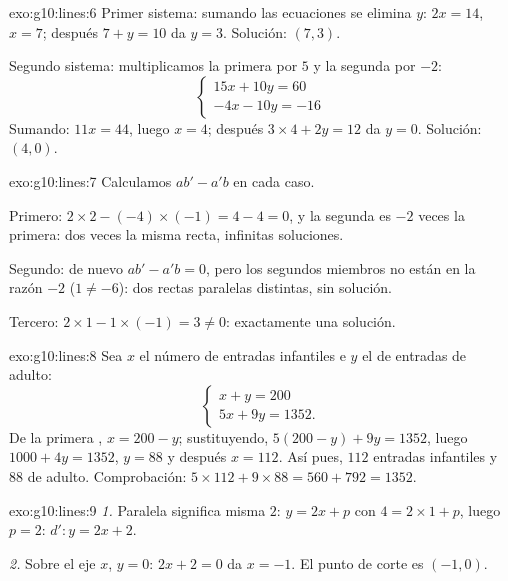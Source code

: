 \begin{solution}{exo:g10:lines:6}
Primer sistema: sumando las ecuaciones se elimina $y$: $2x = 14$, $x = 7$;
después $7 + y = 10$ da $y = 3$. Solución: $(7, 3)$.

Segundo sistema: multiplicamos la primera  por $5$ y la segunda
por $-2$:
\[
\begin{cases}
15x + 10y = 60 \\
-4x - 10y = -16
\end{cases}
\]
Sumando: $11x = 44$, luego $x = 4$; después $3 \times 4 + 2y = 12$ da
$y = 0$. Solución: $(4, 0)$.
\end{solution}

\begin{solution}{exo:g10:lines:7}
Calculamos $ab' - a'b$ en cada caso.

Primero: $2 \times 2 - (-4) \times (-1) = 4 - 4 = 0$, y la segunda
 es $-2$ veces la primera: dos veces la misma recta, infinitas
soluciones.

Segundo: de nuevo $ab' - a'b = 0$, pero los segundos miembros no están en
la razón $-2$ ($1 \neq -6$): dos rectas paralelas distintas, sin solución.

Tercero: $2 \times 1 - 1 \times (-1) = 3 \neq 0$: exactamente una
solución.
\end{solution}

\begin{solution}{exo:g10:lines:8}
Sea $x$ el número de entradas infantiles e $y$ el de entradas de adulto:
\[
\begin{cases}
x + y = 200 \\
5x + 9y = 1352 .
\end{cases}
\]
De la primera , $x = 200 - y$; sustituyendo,
$5(200 - y) + 9y = 1352$, luego $1000 + 4y = 1352$, $y = 88$ y después
$x = 112$. Así pues, $112$ entradas infantiles y $88$ de adulto.
Comprobación: $5 \times 112 + 9 \times 88 = 560 + 792 = 1352$.
\end{solution}

\begin{solution}{exo:g10:lines:9}
\emph{1.} Paralela significa misma  $2$: $y = 2x + p$ con
$4 = 2 \times 1 + p$, luego $p = 2$: $d'\colon y = 2x + 2$.

\emph{2.} Sobre el eje $x$, $y = 0$: $2x + 2 = 0$ da $x = -1$. El punto de
corte es $(-1, 0)$.
\end{solution}

